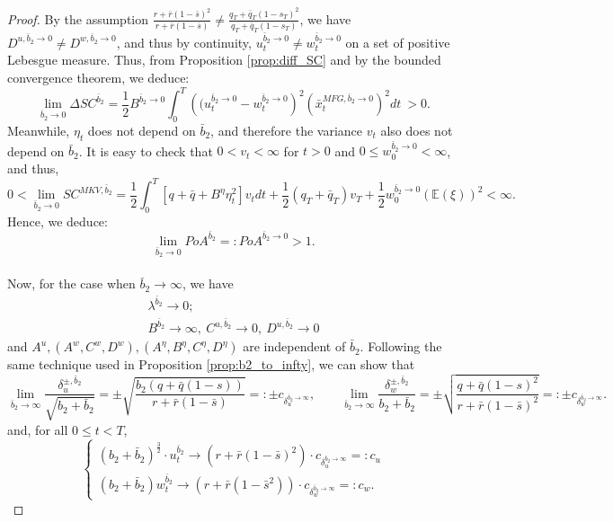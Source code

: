 \documentclass[11pt]{article}
\begin{document}
\begin{proof}
   	By the assumption $\frac{r + \bar{r}(1- \bar{s})^2}{r + \bar{r}(1-\bar{s})} \neq \frac{q_T+\bar{q}_T(1-s_T)^2}{q_T+\bar{q}_T(1-s_T)}$, we have $D^{u,\bar{b}_2 \to 0} \neq D^{w,\bar{b}_2 \to 0}$, and thus by continuity, $u^{\bar{b}_2 \to 0}_t\neq w^{\bar{b}_2 \to 0}_t$ on a set of positive Lebesgue measure. Thus, from Proposition \ref{prop:diff_SC} and by the bounded convergence theorem, we deduce:
	$$ \lim_{\bar{b}_2 \to 0} \Delta SC^{\bar{b}_2} = \frac{1}{2} B^{\bar{b}_2 \to 0} \int_0^T \left( (u_t^{\bar{b}_2 \to 0} - w_t^{\bar{b}_2 \to 0}\right)^2 \left (\bar{x}_t^{MFG,\bar{b}_2 \to 0} \right)^2 dt \  > 0. $$
	Meanwhile, $\eta_t$ does not depend on $\bar{b}_2$, and therefore the variance $v_t$ also does not depend on $\bar{b}_2$. It is easy to check that $0<v_t<\infty$ for $t>0$ and $0 \leq w^{\bar{b}_2 \to 0}_0 < \infty$, and thus,
	\begin{equation*}
	    0<\lim_{\bar{b}_2 \to 0}SC^{MKV,\bar{b}_2} = \frac{1}{2}\int_0^T \left[q+\bar{q} + B^{\eta} \eta_t^2 \right] v_t dt + \frac{1}{2}(q_T + \bar{q}_T) v_T + \frac{1}{2}w^{\bar{b}_2 \to 0}_0 (\mathbb{E}(\xi))^2<\infty.     
	\end{equation*}
	Hence, we deduce:
	$$ \lim_{\bar{b}_2 \to 0} PoA^{\bar{b}_2} =: PoA^{\bar{b}_2 \to 0} > 1. $$\\
	
	
	Now, for the case when $\bar{b}_2 \to \infty$,  we have 
	\begin{equation*}
	\begin{array}{l}
		\lambda^{\bar{b}_2} \to 0;\\
		B^{\bar{b}_2} \to \infty,\ C^{u,\bar{b}_2} \to 0,\ D^{u,\bar{b}_2} \to 0
	\end{array}
	\end{equation*}
	and $A^{u}, (A^w,C^w,D^w), (A^\eta, B^\eta, C^\eta, D^\eta)$ are independent of $\bar{b}_2$.
	Following the same technique used in Proposition \ref{prop:b2_to_infty}, we can show that 
	$$ \lim_{\bar{b}_2 \to \infty} \frac{\delta^{\pm,\bar{b}_2}_u}{\sqrt{b_2 + \bar{b}_2}} =\pm \sqrt{ \frac{b_2 (q + \bar{q}(1-s))}{r + \bar{r}(1-\bar{s})} } =: \pm c_{\delta^{\bar{b}_2 \to \infty}_u},
	\qquad
	\lim_{\bar{b}_2 \to \infty} \frac{\delta^{\pm, \bar{b}_2}_w}{b_2 + \bar{b}_2} = \pm \sqrt{\frac{q+\bar{q}(1-s)^2}{r+ \bar{r}(1-\bar{s})^2}} =: \pm c_{\delta_w^{\bar{b}_2 \to \infty}}.$$
	and, for all $0 \leq t < T$,
	\begin{equation*}
	\left\{
	\begin{array}{l}
	(b_2 + \bar{b}_2)^{\frac{3}{2}}\cdot u^{\bar{b}_2}_t \longrightarrow (r + \bar{r}(1-\bar{s})^2) \cdot c_{\delta^{\bar{b}_2 \to \infty}_u} =: c_u \\
	(b_2 + \bar{b}_2) w_t^{\bar{b}_2} \longrightarrow (r + \bar{r}(1-\bar{s}^2) ) \cdot c_{\delta_w^{\bar{b}_2\to \infty}} =: c_w.
	\end{array}
	\right. 
	\end{equation*}
	

\end{proof}
\end{document}
